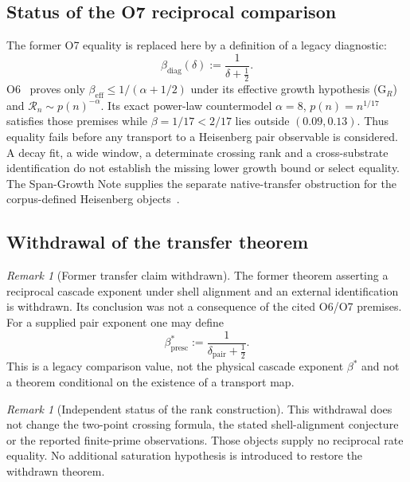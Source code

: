 \documentclass[11pt,a4paper]{article}
\theoremstyle{definition}
\theoremstyle{remark}
\newtheorem{remark}[theorem]{Remark}
\begin{document}
  \subsection{Status of the O7 reciprocal comparison}

    The former O7 equality is replaced here by a definition of a legacy diagnostic:
    \begin{equation}
      \label{eq:O7-relation}
      \beta_{\mathrm{diag}}(\delta):=\frac{1}{\delta+\tfrac12}.
    \end{equation}
    O6~\cite{Beau2026a10} proves only $\beta_{\mathrm{eff}}\leq1/(\alpha+1/2)$ under its
    effective growth hypothesis (G$_R$) and $\mathcal R_n\sim p(n)^{-\alpha}$.
    Its exact power-law countermodel $\alpha=8$, $p(n)=n^{1/17}$ satisfies those premises
    while $\beta=1/17<2/17$ lies outside $(0.09,0.13)$.
    Thus equality fails before any transport to a Heisenberg pair observable is considered.
    A decay fit, a wide window, a determinate crossing rank and a cross-substrate identification
    do not establish the missing lower growth bound or select equality.
    The Span-Growth Note supplies the separate native-transfer obstruction for the corpus-defined
    Heisenberg objects~\cite{Beau2026sgn}.

  \subsection{Withdrawal of the transfer theorem}

    \begin{remark}[Former transfer claim withdrawn]
      \label{thm:conditional-transfer}
      The former theorem asserting a reciprocal cascade exponent under shell alignment and an
      external identification is withdrawn.
      Its conclusion was not a consequence of the cited O6/O7 premises.
      For a supplied pair exponent one may define
      \begin{equation}
        \label{eq:transfer}
        \beta^*_{\mathrm{presc}}:=\frac{1}{\delta_{\mathrm{pair}}+\tfrac12}.
      \end{equation}
      This is a legacy comparison value, not the physical cascade exponent $\beta^*$ and not
      a theorem conditional on the existence of a transport map.
    \end{remark}

    \begin{remark}[Independent status of the rank construction]
      \label{rem:conditional}
      This withdrawal does not change the two-point crossing formula, the stated shell-alignment
      conjecture or the reported finite-prime observations.
      Those objects supply no reciprocal rate equality.
      No additional saturation hypothesis is introduced to restore the withdrawn theorem.
    \end{remark}
\end{document}
